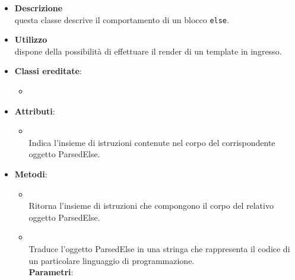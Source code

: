 \label{\nogloxy{swedesigner::server::project::ParsedElse}}
\begin{figure}[h]
\centering
{}
\caption{}
\end{figure}
\FloatBarrier
\begin{itemize}
\item \textbf{Descrizione}\\
questa classe descrive il comportamento di un blocco \texttt{else}.
\item \textbf{Utilizzo}\\
dispone della possibilità di effettuare il render di un template in ingresso.
\item \textbf{Classi ereditate}:
\begin{itemize}
\item \hyperref[\nogloxy{swedesigner::server::project::ParsedInstruction}]{}
\end{itemize}
\item \textbf{Attributi}:
\begin{itemize}
\item {}
\\ Indica l'insieme di istruzioni contenute nel corpo del corrispondente oggetto ParsedElse.
\end{itemize}
\item \textbf{Metodi}:
\begin{itemize}
\item {}
\\ Ritorna l'insieme di istruzioni che compongono il corpo del relativo oggetto ParsedElse.
\item {}
\\ Traduce l'oggetto ParsedElse in una stringa che rappresenta il codice di un particolare linguaggio di programmazione.
\\ \textbf{Parametri}:

\end{itemize}
\end{itemize}
